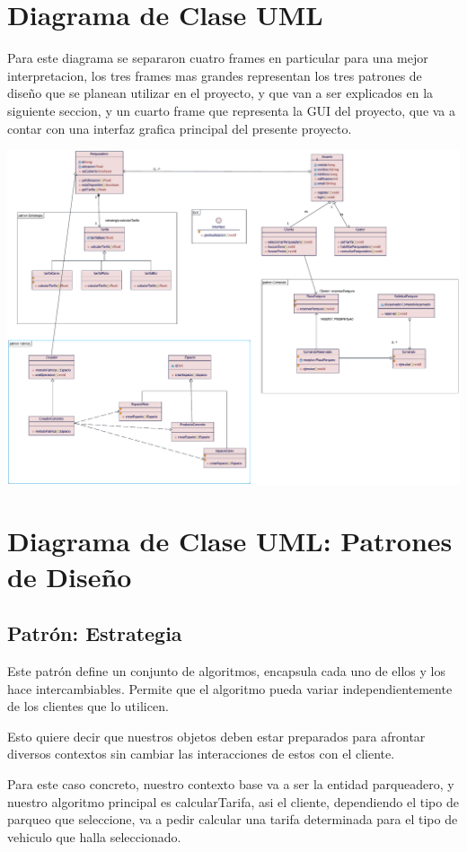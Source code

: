 \newpage
\section{Diagrama de Clase UML}
\begin{flushleft}
Para este diagrama se separaron cuatro frames en particular para una mejor interpretacion, los tres frames mas grandes representan los tres patrones de diseño que se planean utilizar en el proyecto, y que van a ser explicados en la siguiente seccion, y un cuarto frame que representa la GUI del proyecto, que va a contar con una interfaz grafica principal del presente proyecto.
\end{flushleft}

{\includegraphics[width=1.38\linewidth]{imgs/DiagramaClase/DiagramaClase}}
\newpage
\section{Diagrama de Clase UML: Patrones de Diseño}
\subsection{Patrón: Estrategia}
\begin{flushleft}
    Este patrón define un conjunto de algoritmos, encapsula cada uno de ellos y los hace intercambiables. Permite que el algoritmo pueda variar independientemente de los clientes que lo utilicen.

Esto quiere decir que nuestros objetos deben estar preparados para afrontar diversos contextos sin cambiar las interacciones de estos con el cliente.

Para este caso concreto, nuestro contexto base va a ser la entidad parqueadero, y nuestro algoritmo principal es calcularTarifa, asi el cliente, dependiendo el tipo de parqueo que seleccione, va a pedir calcular una tarifa determinada para el tipo de vehiculo que halla seleccionado.
\\

\end{flushleft}

